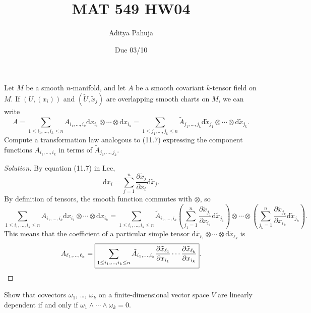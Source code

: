 \documentclass[10pt]{article}
\title{MAT 549 HW04}
\author{\large Aditya Pahuja}
\date{\large Due 03/10}
\newcommand{\dd}{\mathrm{d}}
\newenvironment{soln}{\begin{proof}[Solution]}{\end{proof}}
\begin{document}
\maketitle

\begin{problem}
    [12-8]
    Let $M$ be a smooth $n$-manifold,
    and let $A$ be a smooth covariant $k$-tensor field on $M$.
    If $(U,(x_i))$ and $(\tilde U,\tilde x_j)$ are
    overlapping smooth charts on $M$, we can write
    \begin{equation*}
	A
	= \sum_{1\le i_1,\dots,i_k\le n}A_{i_1,\dots,i_k}
	\dd x_{i_1}\otimes\cdots\otimes\dd x_{i_k}
	= \sum_{1\le j_1,\dots,j_k\le n}\tilde A_{j_1,\dots,j_k}
	\dd \tilde x_{j_1}\otimes\cdots\otimes\dd \tilde x_{j_k}.
    \end{equation*}
    Compute a transformation law analogous to (11.7)
    expressing the component functions $A_{i_1,\dots,i_k}$
    in terms of $\tilde A_{j_1,\dots,j_k}$.
\end{problem}

\begin{soln}
    By equation (11.7) in Lee,
    \begin{equation*}
	\dd x_i =
	\sum_{j=1}^n\frac{\partial \tilde x_j}{\partial x_i}\dd\tilde x_j.
    \end{equation*}
    By definition of tensors, the smooth function commutes
    with $\otimes$, so
    \begin{equation*}
	\sum_{1\le i_1,\dots,i_k\le n}A_{i_1,\dots,i_k}
	\dd x_{i_1}\otimes\cdots\otimes\dd x_{i_k}
	= 
	\sum_{1\le i_1,\dots,i_k\le n}\tilde A_{i_1,\dots,i_k}
	\left(\sum_{j_1=1}^n\frac{\partial \tilde x_{j_1}}
	{\partial x_{i_1}}\dd\tilde x_{j_1}\right)
	\otimes\cdots\otimes
	\left(\sum_{j_k=1}^n\frac{\partial \tilde x_{j_k}}
	{\partial x_{i_k}}\dd\tilde x_{j_k}\right).
    \end{equation*}
    This means that the coefficient of a particular simple tensor
    $\dd\tilde x_{\ell_1}\otimes\cdots\otimes\dd\tilde x_{\ell_k}$ is
    \begin{equation*}
	A_{\ell_1,\dots,\ell_k} =
	\boxed{\sum_{1\le i_1,\dots,i_k\le n} \tilde A_{i_1,\dots,i_k}
	\frac{\partial\tilde x_{\ell_1}}{\partial x_{i_1}}
	\cdots\frac{\partial\tilde x_{\ell_k}}{\partial x_{i_k}}}.\qedhere
    \end{equation*}
\end{soln}

\begin{problem}
    [14-1]
    Show that covectors $\omega_1$, \dots, $\omega_k$
    on a finite-dimensional vector space $V$ are linearly dependent
    if and only if $\omega_1\wedge\cdots\wedge\omega_k = 0$.
\end{problem}
\end{document}
